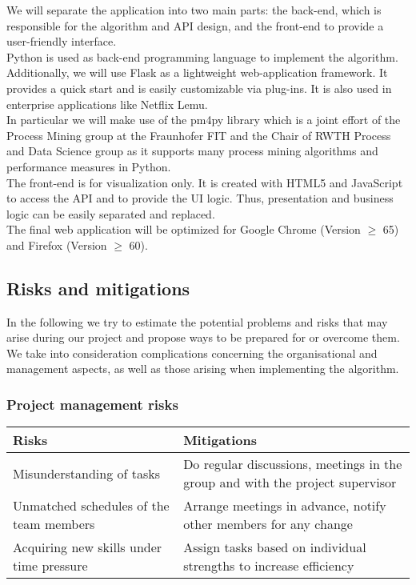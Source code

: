 \documentclass[notitlepage]{article}
\begin{document}
\begin{flushleft}
We will separate the application into two main parts: the back-end, which is responsible for the algorithm and API design, and the front-end to provide a user-friendly interface.\\
\medskip
Python is used as back-end programming language to implement the algorithm. Additionally, we will use Flask as a lightweight web-application framework. 
It provides a quick start and is easily customizable via plug-ins. It is also used in enterprise applications like Netflix Lemu.\\
\medskip
In particular we will make use of the pm4py library which is a joint effort of the Process Mining group at the Fraunhofer FIT and the Chair of
RWTH Process and Data Science group as it supports many process mining algorithms and performance measures in Python.\\
\medskip
The front-end is for visualization only. It is created with HTML5 and JavaScript to access the API and to provide the UI logic. 
Thus, presentation and business logic can be easily separated and replaced.\\
\medskip
The final web application will be optimized for Google Chrome (Version $\geq$ 65) and Firefox (Version $\geq$ 60).


\subsection{Risks and mitigations}
In the following we try to estimate the potential problems and risks that may arise during our project and propose ways to be prepared for or overcome them.
We take into consideration complications concerning the organisational and management aspects, as well as those arising when implementing the algorithm.

\subsubsection{Project management risks}

\begin{tabularx}{15cm}{|X|X|}
\hline
\textbf{Risks} &\textbf{Mitigations}\\
\hline
Misunderstanding of tasks & Do regular discussions, meetings in the group and with the project supervisor\\
\hline
Unmatched schedules of the team members & Arrange meetings in advance, notify other members for any change  \\
\hline
Acquiring new skills under time pressure & Assign tasks based on individual strengths to increase efficiency \\ 
\hline
\end{tabularx}\\ 



\end{flushleft}
\end{document}
